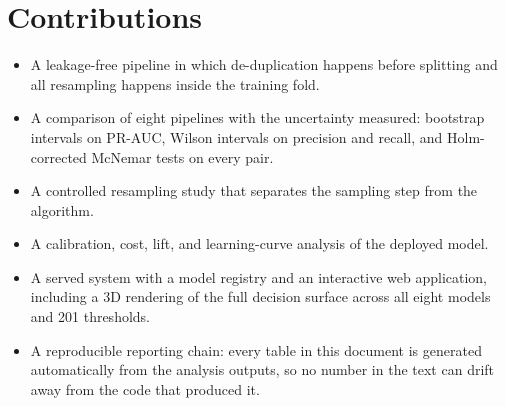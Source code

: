 \section{Contributions}

\begin{itemize}
  \item A leakage-free pipeline in which de-duplication happens before splitting and all
        resampling happens inside the training fold.
  \item A comparison of eight pipelines with the uncertainty measured: bootstrap intervals
        on PR-AUC, Wilson intervals on precision and recall, and Holm-corrected McNemar
        tests on every pair.
  \item A controlled resampling study that separates the sampling step from the algorithm.
  \item A calibration, cost, lift, and learning-curve analysis of the deployed model.
  \item A served system with a model registry and an interactive web application, including
        a 3D rendering of the full decision surface across all eight models and 201
        thresholds.
  \item A reproducible reporting chain: every table in this document is generated
        automatically from the analysis outputs, so no number in the text can drift away
        from the code that produced it.
\end{itemize}
